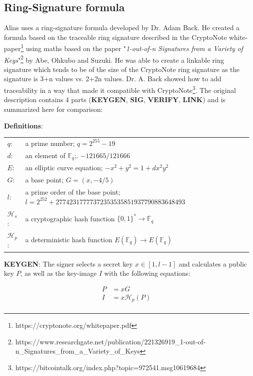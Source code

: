 \subsection{Ring-Signature formula}
Alias uses a ring-signature formula developed by Dr. Adam Back. He 
created a formula based on the traceable ring signature described in the 
CryptoNote white-paper\footnote{https://cryptonote.org/whitepaper.pdf} 
using maths based on the paper "\textit{1-out-of-n Signatures from a Variety of Keys}"\footnote{https://www.researchgate.net/publication/221326919\_1-out-of-n\_Signatures\_from\_a\_Variety\_of\_Keys} 
by Abe, Ohkubo and Suzuki. He was able to create a linkable ring signature 
which tends to be  of the size of the CryptoNote ring signature 
as the signature is 3+n values vs. 2+2n values.
\newpage
\noindent
Dr. A. Back showed how to add traceability in a way that made it compatible with CryptoNote\footnote{https://bitcointalk.org/index.php?topic=972541.msg10619684}. 
The original description contains 4 parts (\textbf{KEYGEN}, \textbf{SIG}, 
\textbf{VERIFY}, \textbf{LINK}) and is summarized here for comparison:


\hfill \break\textbf{Definitions}:
 
\begin{tabular}{ll}
	$q$:   & a prime number; $q = 2^{255} - 19$\\
	$d$:   & an element of $\mathbb{F}_q$;. $-121665/121666$ \\
	$E$:   & an elliptic curve equation; $-x^2 + y^2 = 1 + dx^2y^2$ \\
	$G$:   & a base point; $G=(x, -4/5)$ \\
	$l$:   & a prime order of the base point; $l=2^{252}+27742317777372353535851937790883648493$ \\
	$\mathcal{H}_s$:   & a cryptographic hash function $\{0,1\}^* \rightarrow \mathbb{F}_q$ \\
	$\mathcal{H}_p$:   & a deterministic hash function $E(\mathbb{F}_q) \rightarrow E(\mathbb{F}_q)$ \\	
\end{tabular}

\hfill \break


\hfill \break\textbf{KEYGEN}: 
The signer selects a secret key $x \in [1, l-1]$ and calculates a public 
key $P$, as well as the key-image $I$ with the following equations:

\begin{equation}
\begin{split}
P &= xG\\
I &= x\mathcal{H}_p(P)\\ 
\end{split}
\end{equation}

